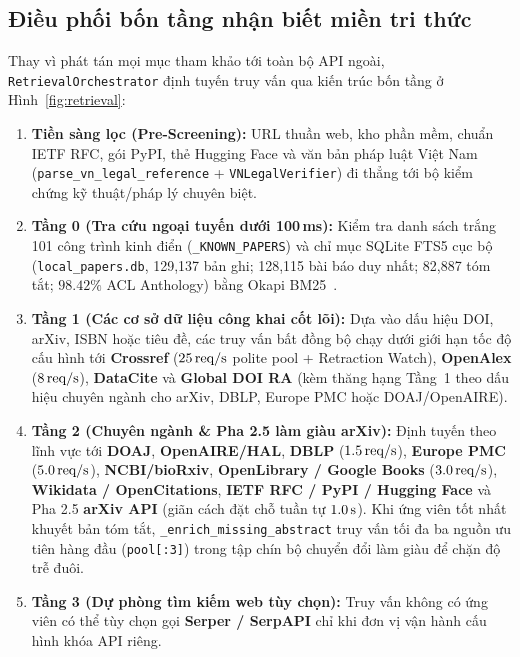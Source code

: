 \subsection{Điều phối bốn tầng nhận biết miền tri thức}

Thay vì phát tán mọi mục tham khảo tới toàn bộ API ngoài, \texttt{Retrieval\allowbreak Orchestrator} định tuyến truy vấn qua kiến trúc bốn tầng ở Hình~\ref{fig:retrieval}:
\begin{enumerate}
    \item \textbf{Tiền sàng lọc (Pre-Screening):} URL thuần web, kho phần mềm, chuẩn IETF RFC, gói PyPI, thẻ Hugging Face và văn bản pháp luật Việt Nam (\texttt{parse\_vn\_legal\_reference} + \texttt{VNLegalVerifier}) đi thẳng tới bộ kiểm chứng kỹ thuật/pháp lý chuyên biệt.
    \item \textbf{Tầng 0 (Tra cứu ngoại tuyến dưới 100\,ms):} Kiểm tra danh sách trắng 101 công trình kinh điển (\texttt{\_KNOWN\_PAPERS}) và chỉ mục SQLite FTS5 cục bộ (\texttt{local\_papers.db}, 129,137 bản ghi; 128,115 bài báo duy nhất; 82,887 tóm tắt; $98.42\%$ ACL Anthology) bằng Okapi BM25~\cite{robertson2009bm25}.
    \item \textbf{Tầng 1 (Các cơ sở dữ liệu công khai cốt lõi):} Dựa vào dấu hiệu DOI, arXiv, ISBN hoặc tiêu đề, các truy vấn bất đồng bộ chạy dưới giới hạn tốc độ cấu hình tới \textbf{Crossref} ($25\text{\,req/s}$ polite pool + Retraction Watch), \textbf{OpenAlex} ($8\text{\,req/s}$), \textbf{DataCite} và \textbf{Global DOI RA} (kèm thăng hạng Tầng~1 theo dấu hiệu chuyên ngành cho arXiv, DBLP, Europe PMC hoặc DOAJ/OpenAIRE).
    \item \textbf{Tầng 2 (Chuyên ngành \& Pha 2.5 làm giàu arXiv):} Định tuyến theo lĩnh vực tới \textbf{DOAJ}, \textbf{OpenAIRE/HAL}, \textbf{DBLP} ($1.5\text{\,req/s}$), \textbf{Europe PMC} ($5.0\text{\,req/s}$), \textbf{NCBI/bioRxiv}, \textbf{OpenLibrary / Google Books} ($3.0\text{\,req/s}$), \textbf{Wikidata / OpenCitations}, \textbf{IETF RFC / PyPI / Hugging Face} và Pha 2.5 \textbf{arXiv API} (giãn cách đặt chỗ tuần tự $1.0\text{\,s}$). Khi ứng viên tốt nhất khuyết bản tóm tắt, \texttt{\_enrich\_missing\_abstract} truy vấn tối đa ba nguồn ưu tiên hàng đầu (\texttt{pool[:3]}) trong tập chín bộ chuyển đổi làm giàu để chặn độ trễ đuôi.
    \item \textbf{Tầng 3 (Dự phòng tìm kiếm web tùy chọn):} Truy vấn không có ứng viên có thể tùy chọn gọi \textbf{Serper / SerpAPI} chỉ khi đơn vị vận hành cấu hình khóa API riêng.
\end{enumerate}

